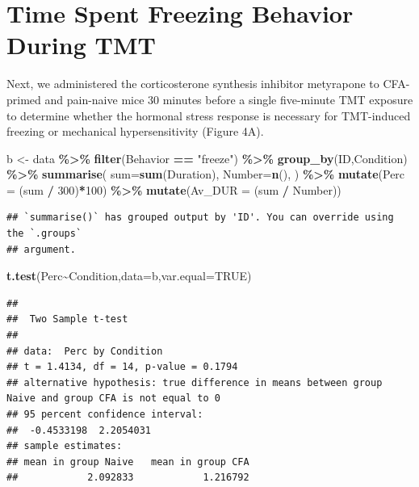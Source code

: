 \documentclass[
]{book}
\newenvironment{Shaded}{\begin{snugshade}}{\end{snugshade}}
\newcommand{\AttributeTok}[1]{\textcolor[rgb]{0.13,0.29,0.53}{#1}}
\newcommand{\ConstantTok}[1]{\textcolor[rgb]{0.56,0.35,0.01}{#1}}
\newcommand{\DecValTok}[1]{\textcolor[rgb]{0.00,0.00,0.81}{#1}}
\newcommand{\FunctionTok}[1]{\textcolor[rgb]{0.13,0.29,0.53}{\textbf{#1}}}
\newcommand{\NormalTok}[1]{#1}
\newcommand{\OtherTok}[1]{\textcolor[rgb]{0.56,0.35,0.01}{#1}}
\newcommand{\SpecialCharTok}[1]{\textcolor[rgb]{0.81,0.36,0.00}{\textbf{#1}}}
\newcommand{\StringTok}[1]{\textcolor[rgb]{0.31,0.60,0.02}{#1}}
\begin{document}
\section*{Time Spent Freezing Behavior During TMT}\label{time-spent-freezing-behavior-during-tmt}

Next, we administered the corticosterone synthesis inhibitor metyrapone to CFA-primed and pain-naive mice 30 minutes before a single five-minute TMT exposure to determine whether the hormonal stress response is necessary for TMT-induced freezing or mechanical hypersensitivity (Figure 4A).

\begin{Shaded}
\begin{Highlighting}[]
\NormalTok{b }\OtherTok{\textless{}{-}}\NormalTok{ data  }\SpecialCharTok{\%\textgreater{}\%}
  \FunctionTok{filter}\NormalTok{(Behavior }\SpecialCharTok{==} \StringTok{"freeze"}\NormalTok{) }\SpecialCharTok{\%\textgreater{}\%}
  \FunctionTok{group\_by}\NormalTok{(ID,Condition) }\SpecialCharTok{\%\textgreater{}\%}
  \FunctionTok{summarise}\NormalTok{(}
    \AttributeTok{sum=}\FunctionTok{sum}\NormalTok{(Duration),}
    \AttributeTok{Number=}\FunctionTok{n}\NormalTok{(),}
\NormalTok{  ) }\SpecialCharTok{\%\textgreater{}\%}
  \FunctionTok{mutate}\NormalTok{(}\AttributeTok{Perc =}\NormalTok{ (sum }\SpecialCharTok{/} \DecValTok{300}\NormalTok{)}\SpecialCharTok{*}\DecValTok{100}\NormalTok{) }\SpecialCharTok{\%\textgreater{}\%}
  \FunctionTok{mutate}\NormalTok{(}\AttributeTok{Av\_DUR =}\NormalTok{ (sum }\SpecialCharTok{/}\NormalTok{ Number))}
\end{Highlighting}
\end{Shaded}

\begin{verbatim}
## `summarise()` has grouped output by 'ID'. You can override using the `.groups`
## argument.
\end{verbatim}

\begin{Shaded}
\begin{Highlighting}[]
\FunctionTok{t.test}\NormalTok{(Perc}\SpecialCharTok{\textasciitilde{}}\NormalTok{Condition,}\AttributeTok{data=}\NormalTok{b,}\AttributeTok{var.equal=}\ConstantTok{TRUE}\NormalTok{)}
\end{Highlighting}
\end{Shaded}

\begin{verbatim}
## 
##  Two Sample t-test
## 
## data:  Perc by Condition
## t = 1.4134, df = 14, p-value = 0.1794
## alternative hypothesis: true difference in means between group Naive and group CFA is not equal to 0
## 95 percent confidence interval:
##  -0.4533198  2.2054031
## sample estimates:
## mean in group Naive   mean in group CFA 
##            2.092833            1.216792
\end{verbatim}
\end{document}
